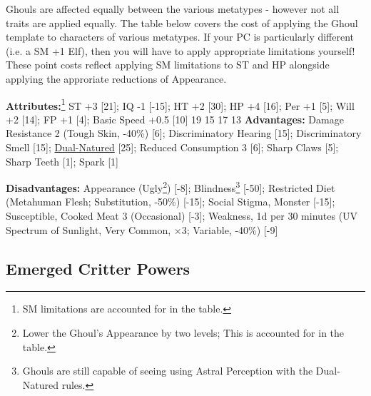 \begin{multicols*}{3}
	Ghouls are affected equally between the various metatypes - however not all traits are applied equally. The table below covers the cost of applying the Ghoul template to characters of various metatypes. If your PC is particularly different (i.e. a SM +1 Elf), then you will have to apply appropriate limitations yourself!	These point costs reflect applying SM limitations to ST and HP alongside applying the approriate reductions of Appearance.
	
	\begin{center}
		\begin{adjustwidth}{-9mm}{}
		\end{adjustwidth}
	\end{center}
	
	\textbf{Attributes:}\footnote{SM limitations are accounted for in the table.}
	ST +3 [21]; IQ -1 [-15]; HT +2 [30]; HP +4 [16]; Per +1 [5]; Will +2 [14]; FP +1 [4]; Basic Speed +0.5 [10]	
	19 15
	17 13
	\textbf{Advantages:}
	Damage Resistance 2 (Tough Skin, -40\%) [6]; Discriminatory Hearing [15]; Discriminatory Smell [15]; \hyperref[dual_natured]{Dual-Natured} [25]; Reduced Consumption 3 [6]; Sharp Claws [5]; Sharp Teeth [1]; Spark [1]
	
	\textbf{Disadvantages:}
	Appearance (Ugly\footnote{Lower the Ghoul's Appearance by two levels; This is accounted for in the table.}) [-8]; Blindness\footnote{Ghouls are still capable of seeing using Astral Perception with the Dual-Natured rules.} [-50]; Restricted Diet (Metahuman Flesh; Substitution, -50\%) [-15]; Social Stigma, Monster [-15]; Susceptible, Cooked Meat 3 (Occasional) [-3]; Weakness, 1d per 30 minutes (UV Spectrum of Sunlight, Very Common, $\times$3; Variable, -40\%) [-9]
	
	\subsection{Emerged Critter Powers}
	

\end{multicols*}
